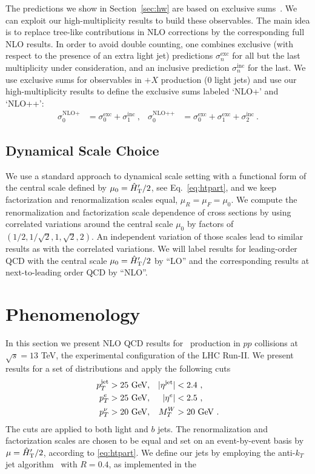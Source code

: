 The predictions we show in Section~\ref{sec:hw} are based on exclusive
sums~\cite{ESums}. We can exploit our high-multiplicity results to build these observables. The main idea is to replace tree-like contributions in NLO
corrections by the corresponding full NLO results. In order to avoid double counting, one combines exclusive (with respect to the presence of an extra light jet)
predictions $\sigma^{\text{exc}}_n$ for all but the last multiplicity under consideration,
and an inclusive prediction $\sigma^{\text{inc}}_n$  for the last.
 We use
exclusive sums for observables in \Wbb$+X$ production (0 light jets) and use our high-multiplicity
results to define the exclusive sums labeled `NLO+' and `NLO++':
\begin{align}\label{eq:excsums}
  \sigma^{\text{NLO+}}_0 &= \sigma^{\text{exc}}_0 + \sigma^{\text{inc}}_1\ , &
\sigma^{\text{NLO++}}_0 &= \sigma^{\text{exc}}_0 +\sigma^{\text{exc}}_1+
\sigma^{\text{inc}}_2\ .
\end{align}

\subsection{Dynamical Scale Choice}
\label{sec:scale}
We use a standard approach to dynamical scale setting with a functional form of the central scale defined by $\mu_0={\hat H}_{\mathrm T}'/2$, see Eq.~\eqref{eq:htpart}, and we keep factorization and renormalization
scales equal, $\mu_R=\mu_F=\mu_0$. We compute the renormalization and factorization scale dependence of cross sections by using correlated variations around the central scale $\mu_0$ by factors of
$(1/2,1/\sqrt{2},1,\sqrt{2},2)$. An independent variation of those scales lead to similar results as with the correlated variations. We will label results for leading-order QCD with the central scale
$\mu_0={\hat H}_{\mathrm T}'/2$ by ``LO'' and the corresponding results at next-to-leading
order QCD by ``NLO''.


\section{Phenomenology}
\label{sec:wbb:pheno}
In this section we present NLO QCD results for \Wbbn~production in
$pp$ collisions at $\sqrt{s}=13$ TeV, the experimental configuration
of the LHC Run-II. We present results for a set of distributions and
apply the following cuts
\begin{align}
  p_T^{\text{jet}}&>25\text{ GeV},& |\eta^{\text{jet}}|&<2.4\ ,\notag\\
  p_T^{e}&>25\text{ GeV},& |\eta^{e}|&<2.5\ ,\notag\\
  p_T^{\nu}&>20\text{ GeV},& M_T^W &> 20\text{ GeV}\ .
  \label{eq:Cuts}
\end{align}
The cuts are applied to both light  and
$b$ jets. The renormalization and factorization scales are chosen to be equal and set on an
event-by-event basis by $\mu={\hat H}_{\mathrm T}'/2$, according to
\cref{eq:htpart}. We define our jets by employing the
anti-$k_T$ jet algorithm~\cite{antikT} with $R=0.4$, as implemented in the


